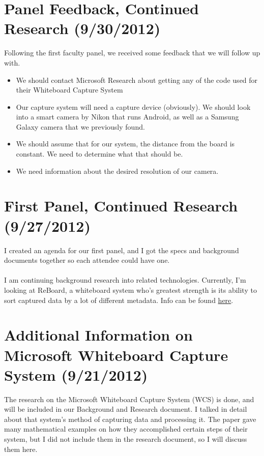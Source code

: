 \documentclass[]{article}
\begin{document}
	\section{Panel Feedback, Continued Research (9/30/2012)}
	Following the first faculty panel, we received some feedback that we will follow up with.
\begin{itemize}
\item We should contact Microsoft Research about getting any of the code used for their Whiteboard Capture System
\item Our capture system will need a capture device (obviously).  We should look into a smart camera by Nikon that runs Android, as well as a Samsung Galaxy camera that we previously found.  
\item We should assume that for our system, the distance from the board is constant.  We need to determine what that should be.  
\item We need information about the desired resolution of our camera.  
\end{itemize}

	\section{First Panel, Continued Research (9/27/2012)}
	I created an agenda for our first panel, and I got the specs and background documents together so each attendee could have one.  \\ \\
I am continuing background research into related technologies.  Currently, I'm looking at ReBoard, a whiteboard system who's greatest strength is its ability to sort captured data by a lot of different metadata. Info can be found \href{http://arxiv.org/ftp/arxiv/papers/0911/0911.0039.pdf}{here}.

	\section{Additional Information on Microsoft Whiteboard Capture System (9/21/2012)}
	The research on the Microsoft Whiteboard Capture System (WCS) is done, and will be included in our Background and Research document.  I talked in detail about that system's method of capturing data and processing it.  The paper gave many mathematical examples on how they accomplished certain steps of their system, but I did not include them in the research document, so I will discuss them here.
\end{document}
